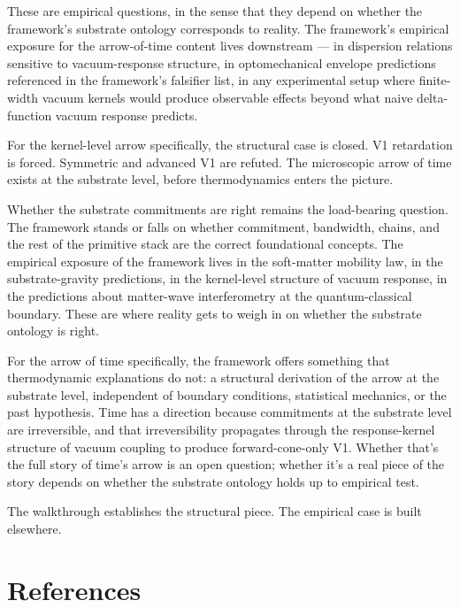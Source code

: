 \documentclass[11pt,a4paper]{article}
\begin{document}
These are empirical questions, in the sense that they depend on whether the framework's substrate ontology corresponds to reality. The framework's empirical exposure for the arrow-of-time content lives downstream --- in dispersion relations sensitive to vacuum-response structure, in optomechanical envelope predictions referenced in the framework's falsifier list, in any experimental setup where finite-width vacuum kernels would produce observable effects beyond what naive delta-function vacuum response predicts.

For the kernel-level arrow specifically, the structural case is closed. V1 retardation is forced. Symmetric and advanced V1 are refuted. The microscopic arrow of time exists at the substrate level, before thermodynamics enters the picture.

Whether the substrate commitments are right remains the load-bearing question. The framework stands or falls on whether commitment, bandwidth, chains, and the rest of the primitive stack are the correct foundational concepts. The empirical exposure of the framework lives in the soft-matter mobility law, in the substrate-gravity predictions, in the kernel-level structure of vacuum response, in the predictions about matter-wave interferometry at the quantum-classical boundary. These are where reality gets to weigh in on whether the substrate ontology is right.

For the arrow of time specifically, the framework offers something that thermodynamic explanations do not: a structural derivation of the arrow at the substrate level, independent of boundary conditions, statistical mechanics, or the past hypothesis. Time has a direction because commitments at the substrate level are irreversible, and that irreversibility propagates through the response-kernel structure of vacuum coupling to produce forward-cone-only V1. Whether that's the full story of time's arrow is an open question; whether it's a real piece of the story depends on whether the substrate ontology holds up to empirical test.

The walkthrough establishes the structural piece. The empirical case is built elsewhere.

\section*{References}
\end{document}
